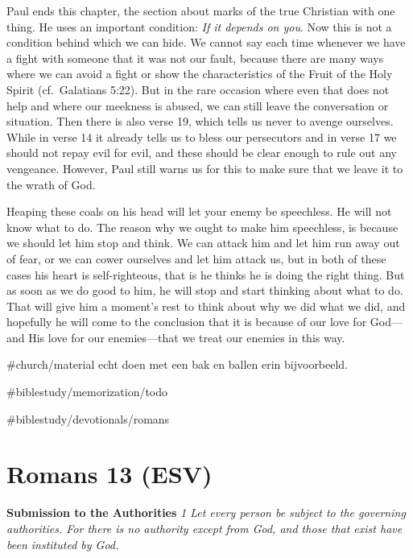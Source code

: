 Paul ends this chapter, the section about marks of the true Christian
with one thing. He uses an important condition: \emph{If it depends on
you}. Now this is not a condition behind which we can hide. We cannot
say each time whenever we have a fight with someone that it was not our
fault, because there are many ways where we can avoid a fight or show
the characteristics of the Fruit of the Holy Spirit (cf.~Galatians
5:22). But in the rare occasion where even that does not help and where
our meekness is abused, we can still leave the conversation or
situation. Then there is also verse 19, which tells us never to avenge
ourselves. While in verse 14 it already tells us to bless our
persecutors and in verse 17 we should not repay evil for evil, and these
should be clear enough to rule out any vengeance. However, Paul still
warns us for this to make sure that we leave it to the wrath of God.

Heaping these coals on his head will let your enemy be speechless. He
will not know what to do. The reason why we ought to make him
speechless, is because we should let him stop and think. We can attack
him and let him run away out of fear, or we can cower ourselves and let
him attack us, but in both of these cases his heart is self-righteous,
that is he thinks he is doing the right thing. But as soon as we do good
to him, he will stop and start thinking about what to do. That will give
him a moment's rest to think about why we did what we did, and hopefully
he will come to the conclusion that it is because of our love for
God---and His love for our enemies---that we treat our enemies in this
way.

\#church/material echt doen met een bak en ballen erin bijvoorbeeld.

\#biblestudy/memorization/todo

\#biblestudy/devotionals/romans

\hypertarget{romans-13-esv}{%
\section{Romans 13 (ESV)}\label{romans-13-esv}}

\textbf{Submission to the Authorities} \emph{1 Let every person be
subject to the governing authorities. For there is no authority except
from God, and those that exist have been instituted by God.}

